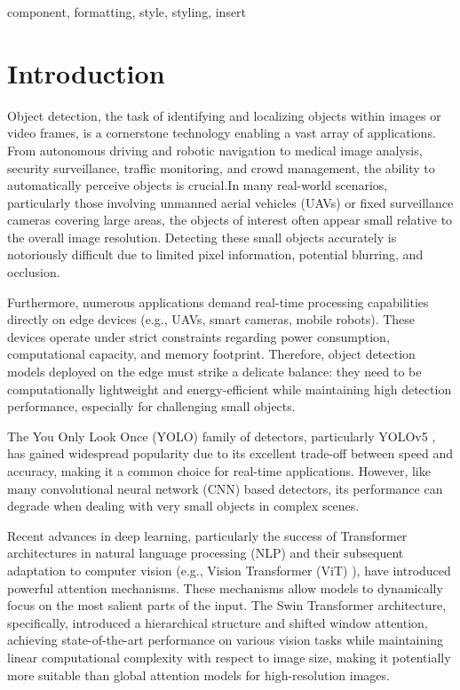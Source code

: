 \documentclass[conference]{IEEEtran}
\begin{document}
\begin{IEEEkeywords}
component, formatting, style, styling, insert
\end{IEEEkeywords}

\section{Introduction}
Object detection, the task of identifying and localizing objects within images or video frames, is a cornerstone technology enabling a vast array of applications. From autonomous driving and robotic navigation to medical image analysis, security surveillance, traffic monitoring, and crowd management, the ability to automatically perceive objects is crucial.In many real-world scenarios, particularly those involving unmanned aerial vehicles (UAVs) or fixed surveillance cameras covering large areas, the objects of interest often appear small relative to the overall image resolution. Detecting these small objects accurately is notoriously difficult due to limited pixel information, potential blurring, and occlusion.

Furthermore, numerous applications demand real-time processing capabilities directly on edge devices (e.g., UAVs, smart cameras, mobile robots). These devices operate under strict constraints regarding power consumption, computational capacity, and memory footprint. Therefore, object detection models deployed on the edge must strike a delicate balance: they need to be computationally lightweight and energy-efficient while maintaining high detection performance, especially for challenging small objects.

The You Only Look Once (YOLO) family of detectors, particularly YOLOv5 \cite{yolov5}, has gained widespread popularity due to its excellent trade-off between speed and accuracy, making it a common choice for real-time applications. However, like many convolutional neural network (CNN) based detectors, its performance can degrade when dealing with very small objects in complex scenes.

Recent advances in deep learning, particularly the success of Transformer architectures \cite{vaswani2017attention} in natural language processing (NLP) and their subsequent adaptation to computer vision (e.g., Vision Transformer (ViT) \cite{Dosovitskiy2020AnII}), have introduced powerful attention mechanisms. These mechanisms allow models to dynamically focus on the most salient parts of the input. The Swin Transformer \cite{Liu2021SwinTH} architecture, specifically, introduced a hierarchical structure and shifted window attention, achieving state-of-the-art performance on various vision tasks while maintaining linear computational complexity with respect to image size, making it potentially more suitable than global attention models for high-resolution images.
\end{document}

